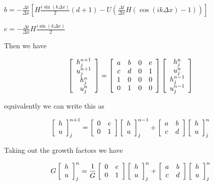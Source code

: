 \documentclass[12pt]{article}
\begin{document}
$b = - \frac{\Delta t}{\Delta x} \left[H\frac{i\sin\left(k\Delta x\right)}{2}(d+1)   -U\left(\frac{\Delta t}{\Delta x}H\left(\cos\left(ik\Delta x\right) - 1\right)\right) \right]$

$e = - \frac{\Delta t}{\Delta x}H\frac{i\sin\left(k\Delta x\right)}{2}$

Then we have

\[
\left[\begin{array}{c}
h^{n+1}_j \\
u^{n+1}_j\\
h^n_j \\
u^n_j
\end{array} \right] = \left[\begin{array}{c c c c}
a & b & 0 & e \\
c & d&0 & 1 \\
1&0&0&0\\
0&1&0&0
\end{array} \right]  \left[\begin{array}{c}
h^{n}_j \\
u^{n}_j\\
h^{n-1}_j \\
u^{n-1}_j
\end{array} \right] 
\]

equivalently we can write this as

\[
\left[\begin{array}{c}
h \\
u
\end{array} \right]^{n+1}_j = \left[\begin{array}{c c}
0 & e \\
0 & 1
\end{array} \right]\left[\begin{array}{c}
h \\
u
\end{array} \right]^{n-1}_j  +\left[\begin{array}{c c}
a & b \\
c & d
\end{array} \right]  \left[\begin{array}{c}
h \\
u
\end{array} \right]^{n}_j 
\]

Taking out the growth factors we have 

\[
G\left[\begin{array}{c}
h \\
u
\end{array} \right]^{n}_j =  \frac{1}{G}\left[\begin{array}{c c}
0 & e \\
0 & 1
\end{array} \right]\left[\begin{array}{c}
h \\
u
\end{array} \right]^{n}_j  +\left[\begin{array}{c c}
a & b \\
c & d
\end{array} \right]  \left[\begin{array}{c}
h \\
u
\end{array} \right]^{n}_j 
\]
\end{document}
